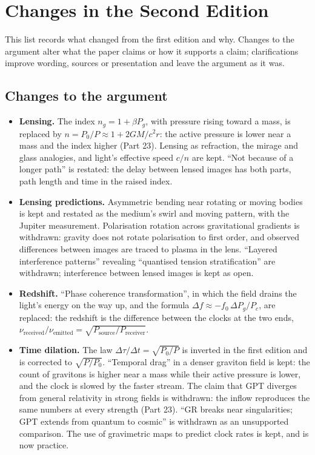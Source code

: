 \clearpage
\section*{Changes in the Second Edition}

This list records what changed from the first edition and why. Changes to the argument alter what the paper claims or how it supports a claim; clarifications improve wording, sources or presentation and leave the argument as it was.

\subsection*{Changes to the argument}
\begin{itemize}
\item \textbf{Lensing.} The index $n_g = 1 + \beta P_g$, with pressure rising toward a mass, is replaced by $n = P_0/P \approx 1 + 2GM/c^2r$: the active pressure is lower near a mass and the index higher (Part 23). Lensing as refraction, the mirage and glass analogies, and light's effective speed $c/n$ are kept. ``Not because of a longer path'' is restated: the delay between lensed images has both parts, path length and time in the raised index.
\item \textbf{Lensing predictions.} Asymmetric bending near rotating or moving bodies is kept and restated as the medium's swirl and moving pattern, with the Jupiter measurement. Polarisation rotation across gravitational gradients is withdrawn: gravity does not rotate polarisation to first order, and observed differences between images are traced to plasma in the lens. ``Layered interference patterns'' revealing ``quantised tension stratification'' are withdrawn; interference between lensed images is kept as open.
\item \textbf{Redshift.} ``Phase coherence transformation'', in which the field drains the light's energy on the way up, and the formula $\Delta f \approx -f_0\,\Delta P_g/P_c$, are replaced: the redshift is the difference between the clocks at the two ends, $\nu_{\text{received}}/\nu_{\text{emitted}} = \sqrt{P_{\text{source}}/P_{\text{receiver}}}$.
\item \textbf{Time dilation.} The law $\Delta\tau/\Delta t = \sqrt{P_0/P}$ is inverted in the first edition and is corrected to $\sqrt{P/P_0}$. ``Temporal drag'' in a denser graviton field is kept: the count of gravitons is higher near a mass while their active pressure is lower, and the clock is slowed by the faster stream. The claim that GPT diverges from general relativity in strong fields is withdrawn: the inflow reproduces the same numbers at every strength (Part 23). ``GR breaks near singularities; GPT extends from quantum to cosmic'' is withdrawn as an unsupported comparison. The use of gravimetric maps to predict clock rates is kept, and is now practice.

\end{itemize}

